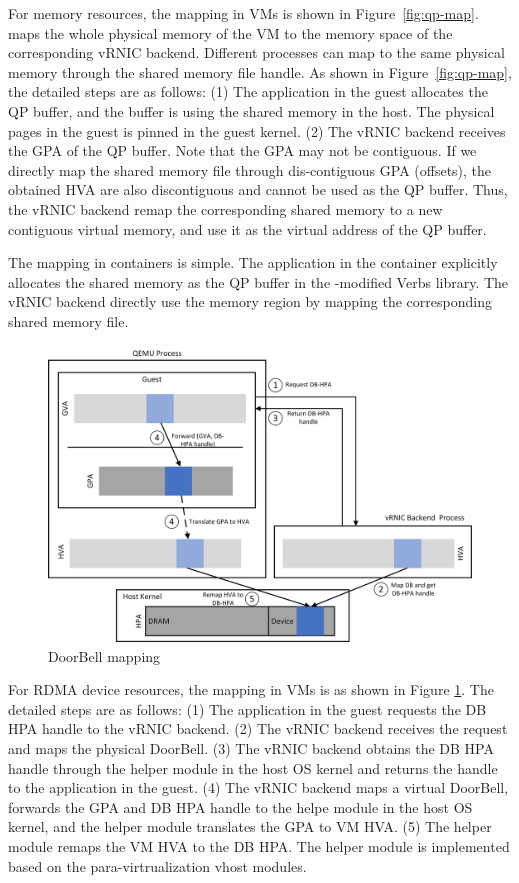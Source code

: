 For memory resources, the mapping in VMs is shown in Figure~\ref{fig:qp-map}. \sys maps the whole physical memory of the VM to the memory space of the corresponding vRNIC backend. Different processes can map to the same physical memory through the shared memory file handle. As shown in Figure~\ref{fig:qp-map}, the detailed steps are as follows: (1) The application in the guest allocates the QP buffer, and the buffer is using the shared memory in the host. The physical pages in the guest is pinned in the guest kernel. (2) The vRNIC backend receives the GPA of the QP buffer. Note that the GPA may not be contiguous. If we directly map the shared memory file through dis-contiguous GPA (offsets), the obtained HVA are also discontiguous and cannot be used as the QP buffer. Thus, the vRNIC backend remap the corresponding shared memory to a new contiguous virtual memory, and use it as the virtual address of the QP buffer.



The mapping in containers is simple. The application in the container explicitly allocates the shared memory as the QP buffer in the \sys-modified Verbs library. The vRNIC backend directly use the memory region by mapping the corresponding shared memory file.


\begin{figure}[!ht]
	\centering
	\includegraphics[width=1\linewidth]{images/db-map.png}
	\caption{DoorBell mapping}
	\label{fig:db-map}
\end{figure}

For RDMA device resources, the mapping in VMs is as shown in Figure \ref{fig:db-map}. The detailed steps are as follows: (1) The application in the guest requests the DB HPA handle to the vRNIC backend. (2) The vRNIC backend receives the request and maps the physical DoorBell. (3) The vRNIC backend obtains the DB HPA handle through the helper module in the host OS kernel and returns the handle to the application in the guest. (4) The vRNIC backend maps a virtual DoorBell, forwards the GPA and DB HPA handle to the helpe module in the host OS kernel, and the helper module translates the GPA to VM HVA. (5) The helper module remaps the VM HVA to the DB HPA. The helper module is implemented based on the para-virtrualization vhost modules.

